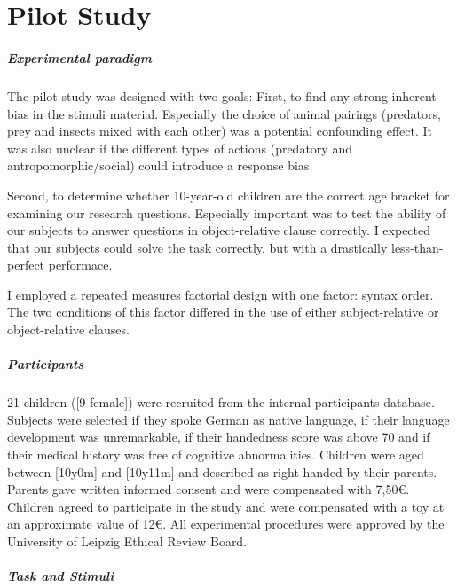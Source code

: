 \chapter{Pilot Study}\label{pilotstudy}

\paragraph{Experimental paradigm}

The pilot study was designed with two goals:
First, to find any strong inherent bias in the stimuli material.
Especially the choice of animal pairings (predators, prey and insects mixed with each other) was a potential confounding effect.
It was also unclear if the different types of actions (predatory and antropomorphic/social) could introduce a response bias.

Second, to determine whether 10-year-old children are the correct age bracket for examining our research questions.
Especially important was to test the ability of our subjects to answer questions in object-relative clause correctly.
I expected that our subjects could solve the task correctly, but with a drastically less-than-perfect performace.

I employed a repeated measures factorial design with one factor: syntax order.
The two conditions of this factor differed in the use of either subject-relative or object-relative clauses.

\paragraph{Participants}

21 children ([9 female]) were recruited from the internal participants database.
Subjects were selected if they spoke German as native language, if their language development was unremarkable, if their handedness score was above 70 and if their medical history was free of cognitive abnormalities.
Children were aged between [10y0m] and [10y11m] and described as right-handed by their parents.
Parents gave written informed consent and were compensated with 7,50\euro.
Children agreed to participate in the study and were compensated with a toy at an approximate value of 12\euro.
All experimental procedures were approved by the University of Leipzig Ethical Review Board.


\paragraph{Task and Stimuli}


